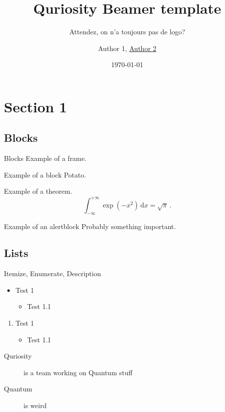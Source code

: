 \documentclass{beamer}
\title{Quriosity Beamer template}
\subtitle{Attendez, on n'a toujours pas de logo?}
\author{Author 1, \underline{Author 2}}
\institute{Télécom Paris, Quriosity Team}
\date{\today}
\begin{document}
    \begin{frame}[plain]
        \maketitle
    \end{frame}
    \section{Section 1}
    \subsection{Blocks}
    \begin{frame}{Blocks}
        Example of a frame.
	    \begin{block}{Example of a block}
		    Potato.
	    \end{block}
        \begin{theorem}
            Example of a theorem.
        \begin{equation}
            \int_{-\infty}^{+\infty}\exp\left(-x^2\right)\,\mathrm{d}x=\sqrt{\pi}\,.
        \end{equation}
        \end{theorem}
        \begin{alertblock}{Example of an alertblock}
            Probably something important.
        \end{alertblock}
    \end{frame}
    \subsection{Lists}
    \begin{frame}{Itemize, Enumerate, Description}
        \begin{itemize}
            \item Test 1
                \begin{itemize}
                    \item Test 1.1
                \end{itemize}
        \end{itemize}
        \begin{enumerate}
            \item Test 1
                \begin{itemize}
                    \item Test 1.1
                \end{itemize}
        \end{enumerate}
        \begin{description}
            \item[Quriosity] is a team working on Quantum stuff
            \item[Quantum] is weird
        \end{description}
    \end{frame}
\end{document}
